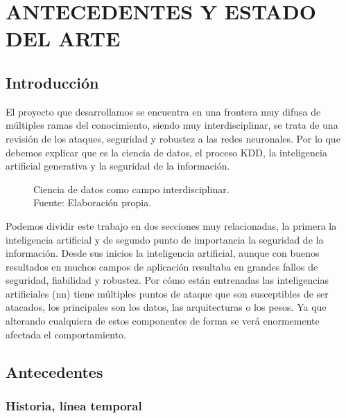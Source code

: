 \chapter{ANTECEDENTES Y ESTADO DEL ARTE}
\label{ch:2}
\section{Introducción}
\label{ch:2:section:introduction}

El proyecto que desarrollamos se encuentra en una frontera muy difusa de múltiples ramas del conocimiento, siendo muy interdisciplinar, se trata de una revisión de los ataques, seguridad y robustez a las redes neuronales.
Por lo que debemos explicar que es la ciencia de datos, el proceso \gls{KDD}, la inteligencia artificial generativa y la seguridad de la información.

\begin{figure}[H]
    \centering
    \centerline{}
    \caption{Ciencia de datos como campo interdisciplinar.\\Fuente: Elaboración propia.}
    \label{fig:ciencia-de-datos}
\end{figure}

Podemos dividir este trabajo en dos secciones muy relacionadas, la primera la inteligencia artificial y de segundo punto de importancia la seguridad de la información.
Desde sus inicios la inteligencia artificial, aunque con buenos resultados en muchos campos de aplicación resultaba en grandes fallos de seguridad, fiabilidad y robustez.
Por cómo están entrenadas las inteligencias artificiales (\acrshort{nn}) tiene múltiples puntos de ataque que son susceptibles de ser atacados, los principales son los datos, las arquitecturas o los pesos.
Ya que alterando cualquiera de estos componentes de forma se verá enormemente afectada el comportamiento.


\section{Antecedentes}
\label{ch:2:section:background}

\subsection{Historia, línea temporal}

